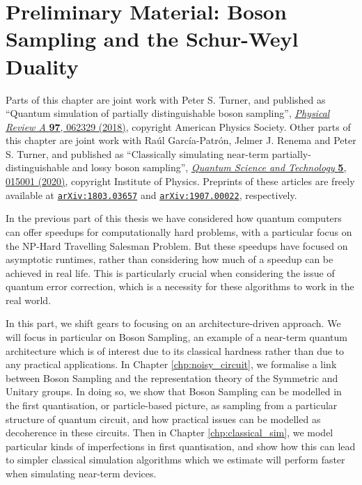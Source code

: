\chapter{Preliminary Material: Boson Sampling and the Schur-Weyl Duality}
\label{chp:preliminary_bs}

Parts of this chapter are joint work with Peter S. Turner, and published as ``Quantum simulation of partially distinguishable boson sampling'', \href{https://link.aps.org/doi/10.1103/PhysRevA.97.062329}{\textit{Physical Review A} \textbf{97}, 062329 (2018)}, copyright American Physics Society. Other parts of this chapter are joint work with Ra\'ul Garc\'ia-Patr\'on, Jelmer J. Renema and Peter S. Turner, and published as ``Classically simulating near-term partially-distinguishable and lossy boson sampling'', \href{https://iopscience.iop.org/article/10.1088/2058-9565/ab5555}{\textit{Quantum Science and Technology} \textbf{5}, 015001 (2020)}, copyright Institute of Physics. Preprints of these articles are freely available at {\tt \href{https://arxiv.org/abs/1803.03657}{arXiv:1803.03657}} and {\tt \href{https://arxiv.org/abs/1907.00022}{arXiv:1907.00022}}, respectively.

In the previous part of this thesis we have considered how quantum computers can offer speedups for computationally hard problems, with a particular focus on the NP-Hard Travelling Salesman Problem. But these speedups have focused on asymptotic runtimes, rather than considering how much of a speedup can be achieved in real life. This is particularly crucial when considering the issue of quantum error correction, which is a necessity for these algorithms to work in the real world.

In this part, we shift gears to focusing on an architecture-driven approach. We will focus in particular on Boson Sampling, an example of a near-term quantum architecture which is of interest due to its classical hardness rather than due to any practical applications. In Chapter \ref{chp:noisy_circuit}, we formalise a link between Boson Sampling and the representation theory of the Symmetric and Unitary groups. In doing so, we show that Boson Sampling can be modelled in the first quantisation, or particle-based picture, as sampling from a particular structure of quantum circuit, and how practical issues can be modelled as decoherence in these circuits. Then in Chapter \ref{chp:classical_sim}, we model particular kinds of imperfections in first quantisation, and show how this can lead to simpler classical simulation algorithms which we estimate will perform faster when simulating near-term devices.

